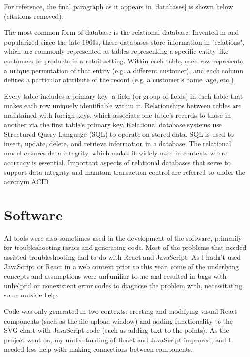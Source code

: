 For reference, the final paragraph as it appears in \autoref{databases} is shown below (citations removed):

\begin{singlespace}\small
	The most common form of database is the relational database. Invented in and popularized since the late 1960s, these databases store information in "relations", which are commonly represented as tables representing a specific entity like customers or products in a retail setting. Within each table, each row represents a unique permutation of that entity (e.g. a different customer), and each column defines a particular attribute of the record (e.g. a customer's name, age, etc.).
	
	Every table includes a primary key: a field (or group of fields) in each table that makes each row uniquely identifiable within it. Relationships between tables are maintained with foreign keys, which associate one table’s records to those in another via the first table's primary key. Relational database systems use Structured Query Language (SQL) to operate on stored data. SQL is used to insert, update, delete, and retrieve information in a database. The relational model ensures data integrity, which makes it widely used in contexts where accuracy is essential. Important aspects of relational databases that serve to support data integrity and maintain transaction control are referred to under the acronym ACID
\end{singlespace}

\section{Software}

AI tools were also sometimes used in the development of the software, primarily for troubleshooting issues and generating code. Most of the problems that needed assisted troubleshooting had to do with React and JavaScript. As I hadn't used JavaScript or React in a web context prior to this year, some of the underlying concepts and assumptions were unfamiliar to me and resulted in bugs with unhelpful or nonexistent error codes to diagnose the problem with, necessitating some outside help.

Code was only generated in two contexts: creating and modifying visual React components (such as the file upload window) and adding functionality to the SVG chart with JavaScript code (such as adding text to the points). As the project went on, my understanding of React and JavaScript improved, and I needed less help with making connections between components.